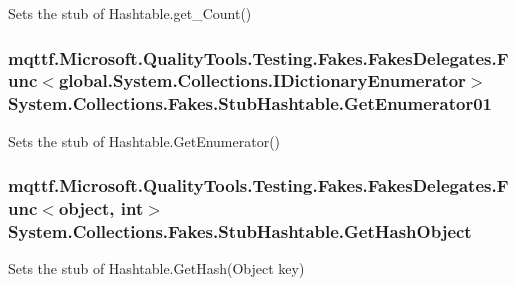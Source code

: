 Sets the stub of Hashtable.\-get\-\_\-\-Count()

\hypertarget{class_system_1_1_collections_1_1_fakes_1_1_stub_hashtable_a581d2229581c8623952f0b75261e6683}{
\subsubsection[{Get\-Enumerator01}]{\setlength{\rightskip}{0pt plus 5cm}mqttf.\-Microsoft.\-Quality\-Tools.\-Testing.\-Fakes.\-Fakes\-Delegates.\-Func$<$global.\-System.\-Collections.\-I\-Dictionary\-Enumerator$>$ System.\-Collections.\-Fakes.\-Stub\-Hashtable.\-Get\-Enumerator01}}\label{class_system_1_1_collections_1_1_fakes_1_1_stub_hashtable_a581d2229581c8623952f0b75261e6683}


Sets the stub of Hashtable.\-Get\-Enumerator()

\hypertarget{class_system_1_1_collections_1_1_fakes_1_1_stub_hashtable_aa30b589cd4bb4dc5c09705199d73ae8a}{
\subsubsection[{Get\-Hash\-Object}]{\setlength{\rightskip}{0pt plus 5cm}mqttf.\-Microsoft.\-Quality\-Tools.\-Testing.\-Fakes.\-Fakes\-Delegates.\-Func$<$object, int$>$ System.\-Collections.\-Fakes.\-Stub\-Hashtable.\-Get\-Hash\-Object}}\label{class_system_1_1_collections_1_1_fakes_1_1_stub_hashtable_aa30b589cd4bb4dc5c09705199d73ae8a}


Sets the stub of Hashtable.\-Get\-Hash(\-Object key)


